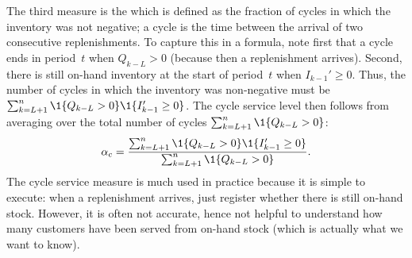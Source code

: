 \documentclass[stochastic-or.tex]{subfiles}
\begin{document}
The third measure is the  which is defined as the fraction of cycles in which the inventory was not negative; a cycle is the time between the arrival of two consecutive replenishments.
To capture this in a formula, note first that a cycle ends in period~$t$ when $Q_{k-L}> 0$ (because then a replenishment arrives).
Second, there is still on-hand inventory at the start of period~$t$ when $I_{k-1}'\geq 0$.
Thus, the number of cycles in which the inventory was non-negative must be $\sum_{k=L+1}^n \1{Q_{k-L}>0}\1{I_{k-1}'\geq 0}$.
The cycle service level then follows from averaging over the total number of cycles $\sum_{k=L+1}^n \1{Q_{k-L}>0}$:
\begin{equation*}
\alpha_c =  \frac{\sum_{k=L+1}^n \1{Q_{k-L}>0}\1{I_{k-1}'\geq 0}}{\sum_{k=L+1}^n \1{Q_{k-L}>0}}.
\end{equation*}
The cycle service measure is much used in practice because it is simple to execute: when a replenishment arrives, just register whether there is still on-hand stock.
However, it is often not accurate, hence not  helpful to understand how many customers have been served from on-hand stock (which is actually what we want to know).
\end{document}
